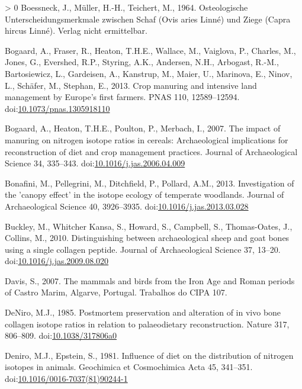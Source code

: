 \documentclass[3p]{elsarticle} %
\newlength{\cslhangindent}
\newenvironment{CSLReferences}[3] %
 {%
  \setlength{\parindent}{0pt}
  \ifodd #1 \everypar{\setlength{\hangindent}{\cslhangindent}}\ignorespaces\fi
  \ifnum #2 > 0
  \setlength{\parskip}{#2\baselineskip}
  \fi
 }%
 {}
\begin{document}
\begin{CSLReferences}{1}{0}
\leavevmode\hypertarget{ref-boessneck_etal64}{}%
Boessneck, J., Müller, H.-H., Teichert, M., 1964. Osteologische {Unterscheidungsmerkmale} zwischen {Schaf} ({Ovis} aries {Linné}) und {Ziege} ({Capra} hircus {Linné}). {Verlag nicht ermittelbar}.

\leavevmode\hypertarget{ref-bogaard_etal13}{}%
Bogaard, A., Fraser, R., Heaton, T.H.E., Wallace, M., Vaiglova, P., Charles, M., Jones, G., Evershed, R.P., Styring, A.K., Andersen, N.H., Arbogast, R.-M., Bartosiewicz, L., Gardeisen, A., Kanstrup, M., Maier, U., Marinova, E., Ninov, L., Schäfer, M., Stephan, E., 2013. Crop manuring and intensive land management by {Europe}'s first farmers. PNAS 110, 12589--12594. doi:\href{https://doi.org/10.1073/pnas.1305918110}{10.1073/pnas.1305918110}

\leavevmode\hypertarget{ref-bogaard_etal07}{}%
Bogaard, A., Heaton, T.H.E., Poulton, P., Merbach, I., 2007. The impact of manuring on nitrogen isotope ratios in cereals: Archaeological implications for reconstruction of diet and crop management practices. Journal of Archaeological Science 34, 335--343. doi:\href{https://doi.org/10.1016/j.jas.2006.04.009}{10.1016/j.jas.2006.04.009}

\leavevmode\hypertarget{ref-bonafini_etal13}{}%
Bonafini, M., Pellegrini, M., Ditchfield, P., Pollard, A.M., 2013. Investigation of the 'canopy effect' in the isotope ecology of temperate woodlands. Journal of Archaeological Science 40, 3926--3935. doi:\href{https://doi.org/10.1016/j.jas.2013.03.028}{10.1016/j.jas.2013.03.028}

\leavevmode\hypertarget{ref-buckley_etal10}{}%
Buckley, M., Whitcher Kansa, S., Howard, S., Campbell, S., Thomas-Oates, J., Collins, M., 2010. Distinguishing between archaeological sheep and goat bones using a single collagen peptide. Journal of Archaeological Science 37, 13--20. doi:\href{https://doi.org/10.1016/j.jas.2009.08.020}{10.1016/j.jas.2009.08.020}

\leavevmode\hypertarget{ref-davis07}{}%
Davis, S., 2007. The mammals and birds from the {Iron Age} and {Roman} periods of {Castro Marim}, {Algarve}, {Portugal}. Trabalhos do CIPA 107.

\leavevmode\hypertarget{ref-deniro85}{}%
DeNiro, M.J., 1985. Postmortem preservation and alteration of in vivo bone collagen isotope ratios in relation to palaeodietary reconstruction. Nature 317, 806--809. doi:\href{https://doi.org/10.1038/317806a0}{10.1038/317806a0}

\leavevmode\hypertarget{ref-deniro_epstein81}{}%
Deniro, M.J., Epstein, S., 1981. Influence of diet on the distribution of nitrogen isotopes in animals. Geochimica et Cosmochimica Acta 45, 341--351. doi:\href{https://doi.org/10.1016/0016-7037(81)90244-1}{10.1016/0016-7037(81)90244-1}


\end{CSLReferences}
\end{document}
